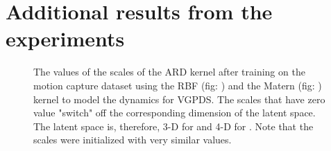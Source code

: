 \documentclass{article} %
\begin{document}
\section{Additional results from the experiments}
\begin{figure}[ht]
\begin{center}
\end{center}
\caption{\small{
The values of the scales of the ARD kernel after training on the motion capture dataset using the RBF (fig: ) and the Matern (fig: ) kernel to model the dynamics for VGPDS. The scales that have zero value "switch" off the corresponding dimension of the latent space. The latent space is, therefore, 3-D for  and 4-D for . Note that the scales were initialized with very similar values.
}
}
\label{fig:supplMocap1}
\end{figure}
\end{document}
